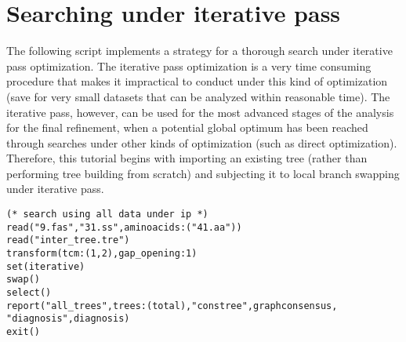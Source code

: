 \section{Searching under iterative pass}{\label{tutorial2}}
The following script implements a strategy for a thorough search under iterative pass optimization. The iterative pass optimization is a very time consuming procedure that makes it impractical to conduct under this kind of optimization (save for very small datasets that can be analyzed within reasonable time). The iterative pass, however, can be used for the most advanced stages of the analysis for the final refinement, when a potential global optimum has been reached through searches under other kinds of optimization (such as direct optimization). Therefore, this tutorial begins with importing an existing tree (rather than performing tree building from scratch) and subjecting it to local branch swapping under iterative pass.

\begin{verbatim}
(* search using all data under ip *)
read("9.fas","31.ss",aminoacids:("41.aa"))
read("inter_tree.tre")
transform(tcm:(1,2),gap_opening:1)
set(iterative)
swap()
select()
report("all_trees",trees:(total),"constree",graphconsensus,
"diagnosis",diagnosis)
exit()
\end{verbatim}

